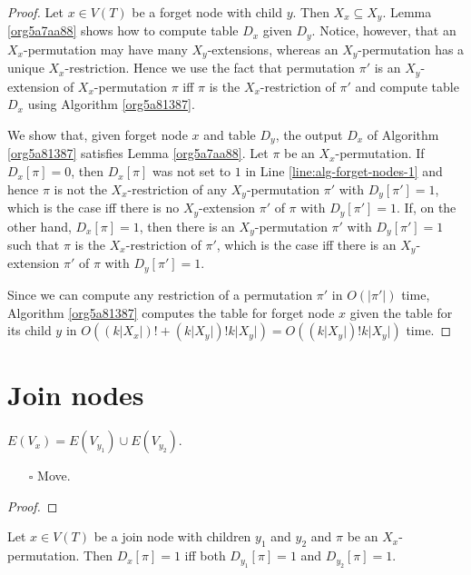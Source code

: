 \documentclass[fontsize=11pt,paper=a4]{book}
\begin{document}
\begin{proof}
Let \(x\in V(T)\) be a forget node with child \(y\).
Then \(X_x\subseteq X_y\).
Lemma \ref{org5a7aa88} shows how to compute table \(D_x\) given \(D_y\).
Notice, however, that an \(X_x\)-permutation may have many \(X_y\)-extensions, whereas an \(X_y\)-permutation has a unique \(X_x\)-restriction.
Hence we use the fact that permutation \(\pi'\) is an \(X_y\)-extension of \(X_x\)-permutation \(\pi\) iff \(\pi\) is the \(X_x\)-restriction of \(\pi'\) and compute table \(D_x\) using Algorithm \ref{org5a81387}.

We show that, given forget node \(x\) and table \(D_y\), the output \(D_x\) of Algorithm \ref{org5a81387} satisfies Lemma \ref{org5a7aa88}.
Let \(\pi\) be an \(X_x\)-permutation.
If \(D_x[\pi]=0\), then \(D_x[\pi]\) was not set to \(1\) in Line \ref{line:alg-forget-nodes-1} and hence \(\pi\) is not the \(X_x\)-restriction of any \(X_y\)-permutation \(\pi'\) with \(D_y[\pi']=1\), which is the case iff there is no \(X_y\)-extension \(\pi'\) of \(\pi\) with \(D_y[\pi']=1\).
If, on the other hand, \(D_x[\pi]=1\), then there is an \(X_y\)-permutation \(\pi'\) with \(D_y[\pi']=1\) such that \(\pi\) is the \(X_x\)-restriction of \(\pi'\), which is the case iff there is an \(X_y\)-extension \(\pi'\) of \(\pi\) with \(D_y[\pi']=1\).

Since we can compute any restriction of a permutation \(\pi'\) in \(O(\lvert\pi'\rvert)\) time, Algorithm \ref{org5a81387} computes the table for forget node \(x\) given the table for its child \(y\) in \(O((k\lvert X_x\rvert)!+(k\lvert X_y\rvert)!k\lvert X_y\rvert)=O((k\lvert X_y\rvert)!k\lvert X_y\rvert)\) time.
\end{proof}

\section{Join nodes}
\label{sec:org0329da4}

\begin{lem}
\(E(V_x)=E(V_{y_1})\cup E(V_{y_2})\).
\label{orga0b1a3a}
\end{lem}

\begin{itemize}
\item[{$\square$}] Move.
\end{itemize}

\begin{proof}
\end{proof}

\begin{lem}
Let \(x\in V(T)\) be a join node with children \(y_1\) and \(y_2\) and \(\pi\) be an \(X_x\)-permutation.
Then \(D_x[\pi]=1\) iff both \(D_{y_1}[\pi]=1\) and \(D_{y_2}[\pi]=1\).
\label{org7bff781}
\end{lem}
\end{document}
